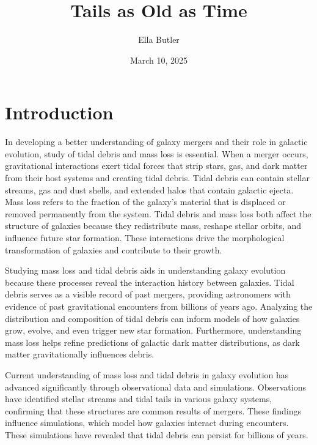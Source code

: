 \documentclass[fleqn,usenatbib]{mnras}
\title{Tails as Old as Time}
\author[]{Ella Butler}
\date{March 10, 2025}
\begin{document}
\label{firstpage}
\pagerange{\pageref{firstpage}--\pageref{lastpage}}
\maketitle


\section{Introduction}
In developing a better understanding of galaxy mergers and their role in galactic evolution, study of tidal debris and mass loss is essential. When a merger occurs, gravitational interactions exert tidal forces that strip stars, gas, and dark matter from their host systems and creating tidal debris. Tidal debris can contain stellar streams, gas and dust shells, and extended halos that contain galactic ejecta. \cite{Toomre_Toomre_1972} Mass loss refers to the fraction of the galaxy's material that is displaced or removed permanently from the system. Tidal debris and mass loss both affect the structure of galaxies because they redistribute mass, reshape stellar orbits, and influence future star formation. These interactions drive the morphological transformation of galaxies and contribute to their growth. \cite{10.1111/j.1365-2966.2004.07725.x}
     
Studying mass loss and tidal debris aids in understanding galaxy evolution because these processes reveal the interaction history between galaxies. Tidal debris serves as a visible record of past mergers, providing astronomers with evidence of past gravitational encounters from billions of years ago. Analyzing the distribution and composition of tidal debris can inform models of how galaxies grow, evolve, and even trigger new star formation. \cite{Mihos_2004}
Furthermore, understanding mass loss helps refine predictions of galactic dark matter distributions, as dark matter gravitationally influences debris.

Current understanding of mass loss and tidal debris in galaxy evolution has advanced significantly through observational data and simulations. Observations have identified stellar streams and tidal tails in various galaxy systems, confirming that these structures are common results of mergers. \cite{Privon_2013} These findings influence simulations, which model how galaxies interact during encounters. These simulations have revealed that tidal debris can persist for billions of years.
\end{document}
